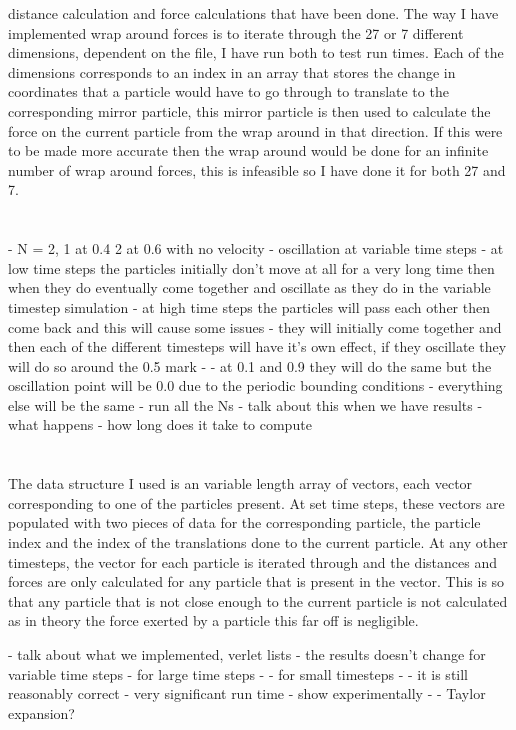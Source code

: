 \documentclass[paper=a4, fontsize=11pt]{scrartcl}
\numberwithin{equation}{section}		%
\numberwithin{figure}{section}			%
\numberwithin{table}{section}				%
\begin{document}
distance calculation and force calculations that have been done. The way I have implemented wrap around forces is to iterate through the 27 or 7 different dimensions, dependent on the file, I have run both to test run times. Each of the dimensions corresponds to an index in an array that stores the change in coordinates that a particle would have to go through to translate to the corresponding mirror particle, this mirror particle is then used to calculate the force on the current particle from the wrap around in that direction. If this were to be made more accurate then the wrap around would be done for an infinite number of wrap around forces, this is infeasible so I have done it for both 27 and 7.

\section{}

- N = 2, 1 at 0.4 2 at 0.6 with no velocity
- oscillation at variable time steps
- at low time steps the particles initially don't move at all for a very long time then when they do eventually come together and oscillate as they do in the variable timestep simulation
- at high time steps the particles will pass each other then come back and this will cause some issues
- they will initially come together and then each of the different timesteps will have it's own effect, if they oscillate they will do so around the 0.5 mark
-
- at 0.1 and 0.9 they will do the same but the oscillation point will be 0.0 due to the periodic bounding conditions
- everything else will be the same
- run all the Ns
- talk about this when we have results
- what happens
- how long does it take to compute

\section{}

The data structure I used is an variable length array of vectors, each vector corresponding to one of the particles present. At set time steps, these vectors are populated with two pieces of data for the corresponding particle, the particle index and the index of the translations done to the current particle. At any other timesteps, the vector for each particle is iterated through and the distances and forces are only calculated for any particle that is present in the vector. This is so that any particle that is not close enough to the current particle is not calculated as in theory the force exerted by a particle this far off is negligible. 

- talk about what we implemented, verlet lists
- the results doesn't change for variable time steps
- for large time steps - 
- for small timesteps - 
- it is still reasonably correct
- very significant run time - show experimentally 
-
- Taylor expansion?

\end{document}
